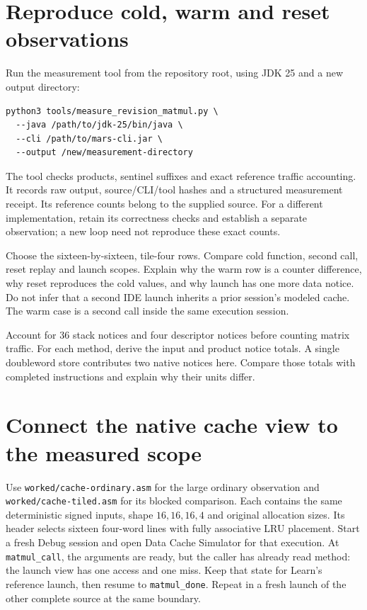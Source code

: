 \section{Reproduce cold, warm and reset observations}

Run the measurement tool from the repository root, using JDK 25 and a new output
directory:
\begin{verbatim}
python3 tools/measure_revision_matmul.py \
  --java /path/to/jdk-25/bin/java \
  --cli /path/to/mars-cli.jar \
  --output /new/measurement-directory
\end{verbatim}
The tool checks products, sentinel suffixes and exact reference traffic accounting.
It records raw output, source/CLI/tool hashes and a structured measurement receipt.
Its reference counts belong to the supplied source. For a different implementation,
retain its correctness checks and establish a separate observation; a new loop
need not reproduce these exact counts.

Choose the sixteen-by-sixteen, tile-four rows. Compare cold function, second call,
reset replay and launch scopes. Explain why the warm row is a counter difference,
why reset reproduces the cold values, and why launch has one more data notice.
Do not infer that a second IDE launch inherits a prior session's modeled cache.
The warm case is a second call inside the same execution session.

Account for 36 stack notices and four descriptor notices before counting matrix
traffic. For each method, derive the input and product notice totals. A single
doubleword store contributes two native notices here. Compare those totals with
completed instructions and explain why their units differ.

\section{Connect the native cache view to the measured scope}

Use \texttt{worked/cache-ordinary.asm} for the large ordinary observation and
\texttt{worked/cache-tiled.asm} for its blocked comparison. Each contains the
same deterministic signed inputs, shape $16,16,16,4$ and original allocation
sizes. Its header selects sixteen four-word lines with fully associative LRU
placement. Start a fresh Debug session and open Data Cache Simulator for that
execution. At \texttt{matmul\_call}, the arguments are ready, but the caller has
already read method: the launch view has one access and one miss. Keep that
state for Learn's reference launch, then resume to \texttt{matmul\_done}.
Repeat in a fresh launch of the other complete source at the same boundary.

